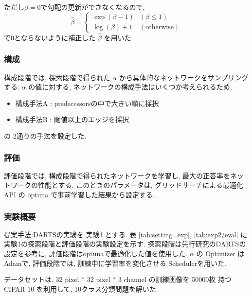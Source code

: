 ただし$\beta=0$で勾配の更新ができなくなるので,
\begin{equation}
  \label{equ:beta}
  \hat{\beta} = \begin{cases}
    \exp(\beta - 1) & (\beta \leq 1) \\
    \log(\beta) + 1 & (\mathrm{otherwise})
  \end{cases}
\end{equation}
で0とならないように補正した $\hat{\beta}$ を用いた.

\subsubsection{構成}

構成段階では, 探索段階で得られた $\alpha$ から具体的なネットワークをサンプリングする.
$\alpha$ の値に対する, ネットワークの構成手法はいくつか考えられるため,
\begin{itemize}
  \item 構成手法A : predecessorsの中で大きい順に採択
  \item 構成手法B : 閾値以上のエッジを採択
\end{itemize}
の 2通りの手法を設定した.

\subsubsection{評価}
評価段階では, 構成段階で得られたネットワークを学習し,
最大の正答率をネットワークの性能とする.
このときのパラメータは, グリッドサーチによる最適化API の optuna \cite{akiba2019optuna}
で事前学習した結果から設定する.


\changeindent{0cm}
\subsubsection{実験概要}
\label{sec:pred.01_03}
\changeindent{2cm}

提案手法:DARTSの実験を 実験1 とする.
表 \ref{tab:setting_exp}, \ref{tab:exp2/eval} に実験1の探索段階と評価段階の実験設定を示す.
探索段階は先行研究のDARTSの設定を参考に, 評価段階はoptunaで最適化した値を使用した.
$\alpha$ の Optimizer はAdam\cite{Kingma2015AdamAM}で,
評価段階では, 訓練中に学習率を変化させる Scheduler\cite{Loshchilov2017SGDRSG}を用いた.

データセットは, 32 pixel * 32 pixel * 3 channel の訓練画像を 50000枚 持つ CIFAR-10\cite{cifar10} を利用して,
10クラス分類問題を解いた.

